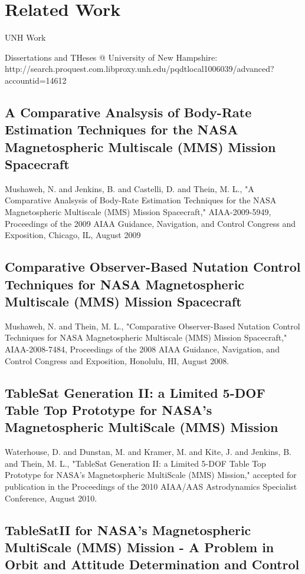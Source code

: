 \section{Related Work}

UNH Work

Dissertations and THeses @ University of New Hampshire:
http://search.proquest.com.libproxy.unh.edu/pqdtlocal1006039/advanced?accountid=14612

\subsection{A Comparative Analsysis of Body-Rate Estimation Techniques for the NASA Magnetospheric Multiscale (MMS) Mission Spacecraft}

Mushaweh, N. and Jenkins, B. and Castelli, D. and Thein, M. L., "A Comparative Analsysis of Body-Rate Estimation Techniques for the NASA Magnetospheric Multiscale (MMS) Mission Spacecraft," AIAA-2009-5949, Proceedings of the 2009 AIAA Guidance, Navigation, and Control Congress and Exposition, Chicago, IL, August 2009

\subsection{Comparative Observer-Based Nutation Control Techniques for NASA Magnetospheric Multiscale (MMS) Mission Spacecraft}

Mushaweh, N. and Thein, M. L., "Comparative Observer-Based Nutation Control Techniques for NASA Magnetospheric Multiscale (MMS) Mission Spacecraft," AIAA-2008-7484, Proceedings of the 2008 AIAA Guidance, Navigation, and Control Congress and Exposition, Honolulu, HI, August 2008.

\subsection{TableSat Generation II: a Limited 5-DOF Table Top Prototype for NASA's Magnetospheric MultiScale (MMS) Mission}

Waterhouse, D. and Dunstan, M. and Kramer, M. and Kite, J. and Jenkins, B. and Thein, M. L., "TableSat Generation II: a Limited 5-DOF Table Top Prototype for NASA's Magnetospheric MultiScale (MMS) Mission," accepted for publication in the Proceedings of the 2010 AIAA/AAS Astrodynamics Specialist Conference, August 2010.

\subsection{TableSatII for NASA's Magnetospheric MultiScale (MMS) Mission - A Problem in Orbit and Attitude Determination and Control}

